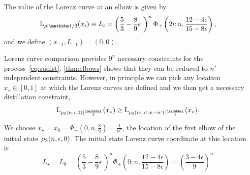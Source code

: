 \documentclass[pra,
aps,
twocolumn,
superscriptaddress,
groupedaddress,
nofootinbib,
reprint
]{revtex4-1}
\begin{document}
The value of the Lorenz curve at an elbow is given by
\begin{equation}
	\lc{\rho}{\id/3}(x_{i}) \equiv L_{i} =  \left( \frac{5}{3} - \frac{8}{9}\epsilon\ \right)^{n} \Phi_+\left(2i;n,\frac{12-4\epsilon}{15-8\epsilon}\right),
\end{equation}
and we define $(x_{-1}, L_{-1}) = (0,0)$.

Lorenz curve comparison provides $9^n$ necessary constraints for the process~\cref{eq:sudist}.
\cref{thm:elbows} shows that they can be reduced to $n'$ independent constraints.
However, in principle we can pick any location $x_\star \in [0,1]$ at which the Lorenz curves are defined and we then get a necessary distillation constraint, 
\begin{equation}
	\lc{\rho_{\rm{S}}(n, \epsilon, 0)}{\frac{\id}{3}}(x_\star) \geq \lc{\rho_{\rm{S}}(n', \epsilon', n-n')}{\frac{\id}{3}}(x_\star).
\end{equation}

We choose $x_\star = x_0 = \Phi_+(0, n, \frac{8}{9}) = \frac{1}{9^{n}}$, the location of the first elbow of the initial state $\rho_{\rm{S}}(n, \epsilon, 0)$.
The initial state Lorenz curve coordinate at this location is
\begin{equation}
	L_\star = L_0 = \left( \frac{5}{3} - \frac{8}{9}\epsilon\ \right)^{n} \Phi_+\left(0;n,\frac{12-4\epsilon}{15-8\epsilon}\right) = \left(\frac{3-4\epsilon}{9}\right)^n
\end{equation}
\end{document}

